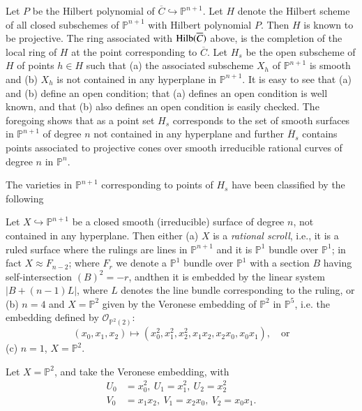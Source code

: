 {\begin{remark}\label{part1-rem13.1}
Let $P$ be the Hilbert polynomial of $\overline{C}\hookrightarrow
\mathbb{P}^{n+1}$. Let $H$ denote the Hilbert scheme of all closed
subschemes of $\mathbb{P}^{n+1}$ with Hilbert polynomial $P$. Then $H$
is known to be projective. The ring associated with
$\operatorname{Hilb}(\overline{C})$ above, is the completion of the local ring of
$H$ at the point corresponding to $\overline{C}$. Let $H_{s}$ be the
open subscheme of $H$ of points $h\in H$ such that (a) the associated
subscheme $X_{h}$ of $\mathbb{P}^{n+1}$ is smooth and (b) $X_{h}$ is
not contained in any hyperplane in $\mathbb{P}^{n+1}$. It is easy to
see that (a) and (b) define an open condition; that (a) defines an
open condition is well known, and that (b) also defines an open
condition is easily checked. The foregoing shows that as a point set
$H_{s}$ corresponds to the set of smooth surfaces in
$\mathbb{P}^{n+1}$ of degree $n$ not contained in any hyperplane and
further $\overline{H}_{s}$ contains points associated to projective
cones over smooth irreducible rational curves of degree $n$ in
$\mathbb{P}^{n}$. 
\end{remark}

The varieties in $\mathbb{P}^{n+1}$ corresponding to points of $H_{s}$
have been classified by the following

\begin{theorem}[Nagata]\label{part1-thm13.1}
Let $X\hookrightarrow \mathbb{P}^{n+1}$ be a closed smooth
(irreducible) surface of degree $n$, not contained in any
hyperplane. Then either (a) $X$ is a {\em rational scroll}, i.e., it
is a ruled surface where the rulings are lines in $\mathbb{P}^{n+1}$
and it is $\mathbb{P}^{1}$ bundle over $\mathbb{P}^{1}$; in fact
$X\approx F_{n-2}$; where $F_{r}$ we denote a $\mathbb{P}^{1}$ bundle
over $\mathbb{P}^{1}$ with a section $B$ having self-intersection
$(B)^{2}=-r$, and\pageoriginale then it is embedded by the linear
system $|B+(n-1)L|$, where $L$ denotes the line bundle corresponding
to the ruling, or (b) $n=4$ and $X=\mathbb{P}^{2}$ given by the
Veronese embedding of $\mathbb{P}^{2}$ in $\mathbb{P}^{5}$, i.e. the
embedding defined by $\mathscr{O}_{\mathbb{P}^{2}(2)}$:
$$
(x_{0},x_{1},x_{2})\mapsto
(x^{2}_{0},x^{2}_{1},x^{2}_{2},x_{1}x_{2},x_{2}x_{0},x_{0}x_{1}),\quad\text{or} 
$$
(c) $n=1$, $X=\mathbb{P}^{2}$.
\end{theorem}

\begin{remark}\label{part1-rem13.2}
Let $X=\mathbb{P}^{2}$, and take the Veronese embedding, with
\begin{align*}
U_{0} &= x^{2}_{0},\ U_{1}=x^{2}_{1},\ U_{2}=x^{2}_{2}\\
V_{0} &= x_{1}x_{2},\ V_{1}=x_{2}x_{0},\ V_{2}=x_{0}x_{1}.
\end{align*}


\end{remark}}
